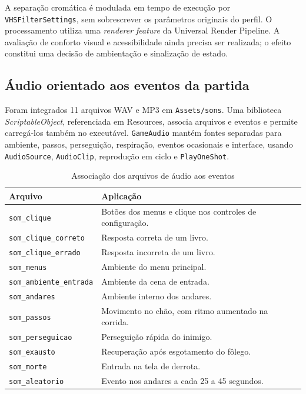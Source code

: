 \documentclass[12pt]{article}
\begin{document}
A separação cromática é modulada em tempo de execução por \texttt{VHSFilterSettings}, sem sobrescrever os parâmetros originais do perfil. O processamento utiliza uma \textit{renderer feature} da Universal Render Pipeline. A avaliação de conforto visual e acessibilidade ainda precisa ser realizada; o efeito constitui uma decisão de ambientação e sinalização de estado.

\subsection{Áudio orientado aos eventos da partida}

Foram integrados 11 arquivos WAV e MP3 em \texttt{Assets/sons}. Uma biblioteca \textit{ScriptableObject}, referenciada em Resources, associa arquivos e eventos e permite carregá-los também no executável. \texttt{GameAudio} mantém fontes separadas para ambiente, passos, perseguição, respiração, eventos ocasionais e interface, usando \texttt{AudioSource}, \texttt{AudioClip}, reprodução em ciclo e \texttt{PlayOneShot}.

\begin{table}[H]
\centering
\caption{Associação dos arquivos de áudio aos eventos}
\label{tab:audio}
\small
\begin{tabularx}{\textwidth}{p{4.6cm}X}
\toprule
\textbf{Arquivo} & \textbf{Aplicação} \\
\midrule
\texttt{som\_clique} & Botões dos menus e clique nos controles de configuração. \\
\texttt{som\_clique\_correto} & Resposta correta de um livro. \\
\texttt{som\_clique\_errado} & Resposta incorreta de um livro. \\
\texttt{som\_menus} & Ambiente do menu principal. \\
\texttt{som\_ambiente\_entrada} & Ambiente da cena de entrada. \\
\texttt{som\_andares} & Ambiente interno dos andares. \\
\texttt{som\_passos} & Movimento no chão, com ritmo aumentado na corrida. \\
\texttt{som\_perseguicao} & Perseguição rápida do inimigo. \\
\texttt{som\_exausto} & Recuperação após esgotamento do fôlego. \\
\texttt{som\_morte} & Entrada na tela de derrota. \\
\texttt{som\_aleatorio} & Evento nos andares a cada 25 a 45 segundos. \\
\bottomrule
\end{tabularx}
\end{table}
\end{document}
